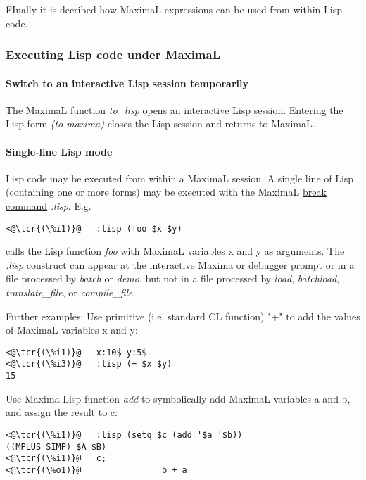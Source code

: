 \documentclass[../Maxima_Workbook.tex]{subfiles}
\begin{document}
FInally it is decribed how MaximaL expressions can be used from within Lisp code.

\subsubsection{Executing Lisp code under MaximaL}

\paragraph{Switch to an interactive Lisp session temporarily} \mbox{}

\lz The MaximaL function \emph{to\_lisp} opens an interactive Lisp session. Entering the Lisp form \emph{(to-maxima)} closes the Lisp session and returns to MaximaL. 

\paragraph{Single-line Lisp mode} \mbox{}

\lz Lisp code may be executed from within a MaximaL session. A single line of Lisp (containing one or more forms) may be executed with the MaximaL \hyperlink{break command}{break command} \emph{:lisp}. E.g.

\begin{lstlisting}
<@\tcr{(\%i1)}@   :lisp (foo $x $y)
\end{lstlisting}

calls the Lisp function \emph{foo} with MaximaL variables x and y as arguments. The \emph{:lisp} construct can appear at the interactive Maxima or debugger prompt or in a file processed by \emph{batch} or \emph{demo}, but not in a file processed by \emph{load}, \emph{batchload}, \emph{translate\_file}, or \emph{compile\_file}.

\lz Further examples: Use primitive (i.e. standard CL function) "+" to add the values of MaximaL variables x and y:

\begin{lstlisting}
<@\tcr{(\%i1)}@   x:10$ y:5$
<@\tcr{(\%i3)}@   :lisp (+ $x $y)
15
\end{lstlisting}

\lz Use Maxima Lisp function \emph{add} to symbolically add MaximaL variables a and b, and assign the result to c:
\begin{lstlisting}
<@\tcr{(\%i1)}@   :lisp (setq $c (add '$a '$b))
((MPLUS SIMP) $A $B)
<@\tcr{(\%i1)}@   c;
<@\tcr{(\%o1)}@ 			   b + a
\end{lstlisting}
\end{document}
